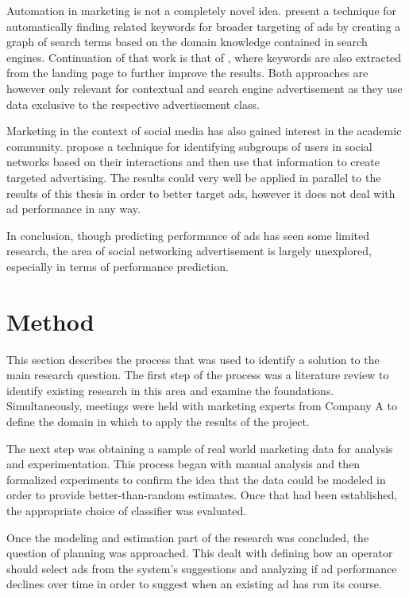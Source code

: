 \documentclass{sig-alternate}
\begin{document}
Automation in marketing is not a completely novel idea. \cite{Joshi2006} present a technique for automatically finding related keywords for broader targeting of ads by creating a graph of search terms based on the domain knowledge contained in search engines. Continuation of that work is that of \cite{Thomaidou2011}, where keywords are also extracted from the landing page to further improve the results. Both approaches are however only relevant for contextual and search engine advertisement as they use data exclusive to the respective advertisement class.

Marketing in the context of social media has also gained interest in the academic community. \cite{Yang2006} propose a technique for identifying subgroups of users in social networks based on their interactions and then use that information to create targeted advertising. The results could very well be applied in parallel to the results of this thesis in order to better target ads, however it does not deal with ad performance in any way.

In conclusion, though predicting performance of ads has seen some limited research, the area of social networking advertisement is largely unexplored, especially in terms of performance prediction.

\section{Method}
\label{ch:Method}
This section describes the process that was used to identify a solution to the main research question. The first step of the process was a literature review to identify existing research in this area and examine the foundations. Simultaneously, meetings were held with marketing experts from Company A to define the domain in which to apply the results of the project.

The next step was obtaining a sample of real world marketing data for analysis and experimentation. This process began with manual analysis and then formalized experiments to confirm the idea that the data could be modeled in order to provide better-than-random estimates. Once that had been established, the appropriate choice of classifier was evaluated.

Once the modeling and estimation part of the research was concluded, the question of planning was approached. This dealt with defining how an operator should select ads from the system's suggestions and analyzing if ad performance declines over time in order to suggest when an existing ad has run its course.
\end{document}
